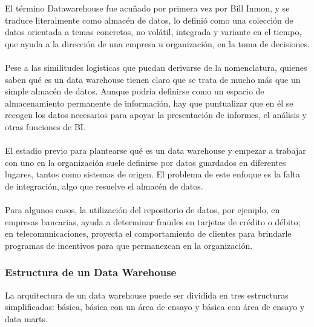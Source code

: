 \documentclass[11pt,a4paper]{article}
\begin{document}
			El término Datawarehouse fue acuñado por primera vez por Bill Inmon, y se traduce literalmente como almacén de datos, lo definió como una colección de datos orientada a temas concretos, no volátil, integrada y variante en el tiempo, que ayuda a la dirección de una empresa u organización, en la toma de decisiones.\\
			\\
			Pese a las similitudes logísticas que puedan derivarse de la nomenclatura, quienes saben qué es un data warehouse tienen claro que se trata de mucho más que un simple almacén de datos. Aunque podría definirse como un espacio de almacenamiento permanente de información, hay que puntualizar que en él se recogen los datos necesarios para apoyar la presentación de informes, el análisis y otras funciones de BI.\\
			\\
			El estadio previo para plantearse qué es un data warehouse y empezar a trabajar con uno en la organización suele definirse por datos guardados en diferentes lugares, tantos como sistemas de origen. El problema de este enfoque es la falta de integración, algo que resuelve el almacén de datos.\\
			\\
			Para algunos casos, la utilización del repositorio de datos, por ejemplo, en empresas bancarias, ayuda a determinar fraudes en tarjetas de crédito o débito; en telecomunicaciones, proyecta el comportamiento de clientes para brindarle programas de incentivos para que permanezcan en la organización.\cite{DWarehouse01:Online}
			
			\subsubsection{Estructura de un Data Warehouse}
			
			La arquitectura de un data warehouse puede ser dividida en tres estructuras simplificadas: básica, básica con un área de ensayo y básica con área de ensayo y data marts.
			
\end{document}
